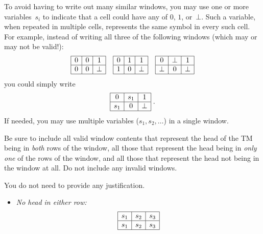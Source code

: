 \documentclass[11pt,addpoints, answers]{exam}
\begin{document}
\begin{questions}
\begin{parts}
  To avoid having to write out many similar windows, you may use one or more variables~$s_i$ to indicate that a cell could have any of $0$, $1$, or~$\bot$.
  Such a variable, when repeated in multiple cells, represents the same symbol in every such cell.
  For example, instead of writing all three of the following windows (which may or may not be valid!):
  \[
    \begin{array}{|c|c|c|}
      \hline
      0 & 0 & 1 \\
      \hline
      0 & 0 & \bot \\
      \hline
    \end{array}
    \quad
    \begin{array}{|c|c|c|}
      \hline
      0 & 1 & 1 \\
      \hline
      1 & 0 & \bot \\
      \hline
    \end{array}
    \quad
    \begin{array}{|c|c|c|}
      \hline
      0 & \bot & 1 \\
      \hline
      \bot & 0 & \bot \\
      \hline
    \end{array}
  \]
  you could simply write
  \[\begin{array}{|c|c|c|}
      \hline
      0 & s_1 & 1 \\
      \hline
      s_1 & 0 & \bot \\
      \hline
    \end{array} \; .
  \]
  If needed, you may use multiple variables ($s_1, s_2, \ldots$) in a single window.

  Be sure to include all valid window contents that represent the head of the TM being in \emph{both} rows of the window, all those that represent the head being in \emph{only one} of the rows of the window, and all those that represent the head not being in the window at all.
  Do not include any invalid windows.

  You do not need to provide any justification. 

  \begin{solution}
  \begin{itemize}
  \item \textit{No head in either row:}
  \[
  \begin{array}{|c|c|c|}
  \hline
  s_1 & s_2 & s_3\\
  \hline
  s_1 & s_2 & s_3\\
  \hline
  \end{array}
  \]
  

\end{itemize}
\end{solution}
\end{parts}
\end{questions}
\end{document}
